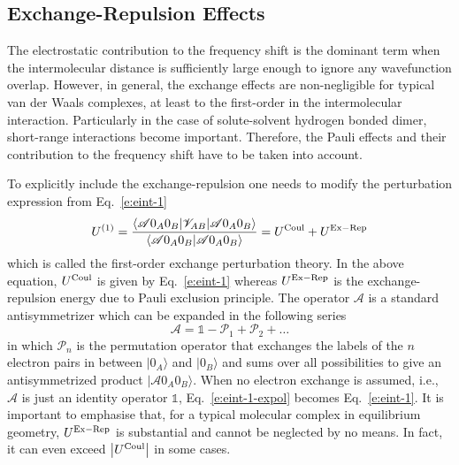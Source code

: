 \documentclass[a4paper,titlepage,twoside,fleqn,12pt]{book}
\begin{document}
\begin{refsection}
\subsection{Exchange-Repulsion Effects\label{s:dw-exrep}}

The electrostatic contribution to the frequency shift is the dominant term 
when the intermolecular distance is sufficiently large enough to ignore 
any wavefunction overlap. However, in general, the exchange effects
are non\hyp{}negligible for typical van der Waals complexes, at least to the first\hyp{}order
in the intermolecular interaction. Particularly 
in the case of solute\hyp{}solvent hydrogen bonded dimer, 
short\hyp{}range interactions become important. 
Therefore, the Pauli effects and their contribution to the frequency shift have to be taken into account.

To explicitly include the exchange\hyp{}repulsion one needs to
modify the perturbation expression from Eq.~\eqref{e:eint-1}
%
\begin{equation} \label{e:eint-1-expol}
U^{(1)} = 
\frac{
\langle \mathscr{A} 0_A0_B \lvert \mathscr{V}_{AB} \rvert \mathscr{A} 0_A0_B \rangle 
}{
\langle \mathscr{A} 0_A0_B \vert \mathscr{A} 0_A0_B \rangle 
}
= U^{\rm Coul} + U^{\rm Ex-Rep}
\end{equation}
%
which is called the first\hyp{}order exchange perturbation theory.
In the above equation, $U^{\rm Coul}$ is given by Eq.~\eqref{e:eint-1}
whereas $U^{\rm Ex-Rep}$ is the exchange\hyp{}repulsion
energy due to Pauli exclusion principle.
The operator $\mathscr{A}$ is a standard antisymmetrizer which
can be expanded in the following series
%
\begin{equation} \label{e:antisymmetrizer-series}
 \mathscr{A} = \mathbb{1} - \mathscr{P}_1 + \mathscr{P}_2 + \ldots
\end{equation}
%
in which $\mathscr{P}_n$ is the permutation operator that exchanges the labels 
of the $n$ electron pairs in between $\vert 0_A \rangle$ and $\vert 0_B \rangle$
and sums over all possibilities to give an antisymmetrized product
$\vert \mathscr{A} 0_A0_B \rangle $. When no electron exchange is
assumed, i.e., $\mathscr{A}$ is just an identity operator $\mathbb{1}$, 
Eq.~\eqref{e:eint-1-expol} becomes Eq.~\eqref{e:eint-1}. It is important to emphasise that, for 
a typical molecular complex in equilibrium geometry, $U^{\rm Ex-Rep}$
is substantial and cannot be neglected by no means. In fact, it can even 
exceed $\left|U^{\rm Coul}\right|$ in some cases.


\end{refsection}
\end{document}
